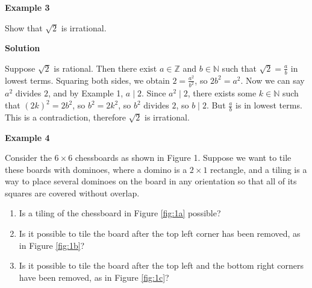 \documentclass{article}
\begin{document}
    \vspace{1.5mm}
    \textbf{Example 3}
    
    \vspace{1.5mm}
    Show that $\sqrt{2}$ is irrational.
    
    \vspace{1.5mm}
    \textbf{Solution}
    
    \vspace{1.5mm}
    Suppose $\sqrt{2}$ is rational. Then there exist $a \in \mathbb{Z}$ and $b \in \mathbb{N}$ such that $\sqrt{2} = \frac{a}{b}$ in lowest terms. Squaring both sides, we obtain $2 = \frac{a^{2}}{b^{2}}$, so $2b^{2} = a^{2}$. Now we can say $a^{2}$ divides $2$, and by Example 1, $a \mid 2$. Since $a^{2} \mid 2$, there exists some $k \in \mathbb{N}$ such that $(2k)^{2} = 2b^{2}$, so $b^{2} = 2k^{2}$, so $b^{2}$ divides $2$, so $b \mid 2$. But $\frac{a}{b}$ is in lowest terms. This is a contradiction, therefore $\sqrt{2}$ is irrational.


    \vspace{1.5mm}
    \textbf{Example 4}
    
    \vspace{1.5mm}
    Consider the $6 \times 6$ chessboards as shown in Figure 1. Suppose we want to tile these boards with dominoes, where a domino is a $2 \times 1$ rectangle, and a tiling is a way to place several dominoes on the board in any orientation so that all of its squares are covered without overlap.
    \begin{enumerate}
        \item Is a tiling of the chessboard in Figure \ref*{fig:1a} possible?
        \item Is it possible to tile the board after the top left corner has been removed, as in Figure \ref*{fig:1b}?
        \item Is it possible to tile the board after the top left and the bottom right corners have been removed, as in Figure \ref*{fig:1c}?
    \end{enumerate}
    
\end{document}
